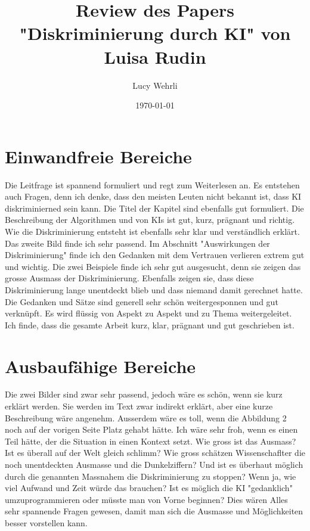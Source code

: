 \documentclass{article}
\title{Review des Papers "Diskriminierung durch KI" von Luisa Rudin}
\author{Lucy Wehrli}
\date{\today}
\begin{document}
\maketitle

\section{Einwandfreie Bereiche}
Die Leitfrage ist spannend formuliert und regt zum Weiterlesen an. Es entstehen auch Fragen, denn ich denke, dass den meisten Leuten nicht bekannt ist, dass KI diskriminierned sein kann. Die Titel der Kapitel sind ebenfalls gut formuliert. Die Beschreibung der Algorithmen und von KIs ist gut, kurz, prägnant und richtig. Wie die Diskriminierung entsteht ist ebenfalls sehr klar und verständlich erklärt. Das zweite Bild finde ich sehr passend. Im Abschnitt "Auswirkungen der Diskriminierung" finde ich den Gedanken mit dem Vertrauen verlieren extrem gut und wichtig. Die zwei Beispiele finde ich sehr gut ausgesucht, denn sie zeigen das grosse Ausmass der Diskriminierung. Ebenfalls zeigen sie, dass diese Diskriminierung lange unentdeckt blieb und dass niemand damit gerechnet hatte. Die Gedanken und Sätze sind generell sehr schön weitergesponnen und gut verknüpft. Es wird flüssig von Aspekt zu Aspekt und zu Thema weitergeleitet. Ich finde, dass die gesamte Arbeit kurz, klar, prägnant und gut geschrieben ist. 


\section{Ausbaufähige Bereiche}
Die zwei Bilder sind zwar sehr passend, jedoch wäre es schön, wenn sie kurz erklärt werden. Sie werden im Text zwar indirekt erklärt, aber eine kurze Beschreibung wäre angenehm. Ausserdem wäre es toll, wenn die Abbildung 2 noch auf der vorigen Seite Platz gehabt hätte. Ich wäre sehr froh, wenn es einen Teil hätte, der die Situation in einen Kontext setzt. Wie gross ist das Ausmass? Ist es überall auf der Welt gleich schlimm? Wie gross schätzen Wissenschaflter die noch unentdeckten Ausmasse und die Dunkelziffern? Und ist es überhaut möglich durch die genannten Massnahem die Diskriminierung zu stoppen? Wenn ja, wie viel Aufwand und Zeit würde das brauchen? Ist es möglich die KI "gedanklich" umzuprogrammieren oder müsste man von Vorne beginnen? Dies wären Alles sehr spannende Fragen gewesen, damit man sich die Ausmasse und Möglichkeiten besser vorstellen kann.


\printbibliography
\end{document}
